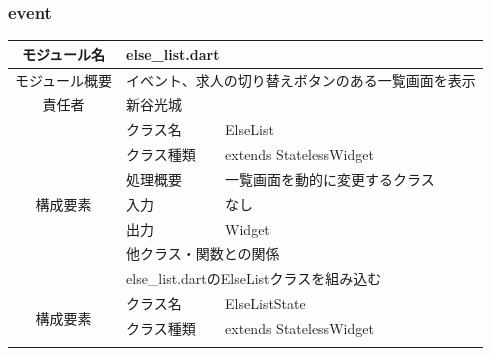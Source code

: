 \subsubsection{event}
\begin{table}[H]
  \centering
  \begin{tabular}{|c|l|l|} \hline
    モジュール名                & \multicolumn{2}{l|}{else\_list.dart}                                                                     \\ \hline
    モジュール概要               & \multicolumn{2}{p{12cm}|}{イベント、求人の切り替えボタンのある一覧画面を表示}                                                     \\ \hline
    責任者                   & \multicolumn{2}{l|}{新谷光城}                                                                                \\ \hline
    \multirow{7}{*}{構成要素} & クラス名                                                        & ElseList                                   \\ \cline{2-3}
                          & クラス種類                                                       & extends StatelessWidget                    \\ \cline{2-3}
                          & 処理概要                                                        & \multicolumn{1}{p{12cm}|}{一覧画面を動的に変更するクラス} \\ \cline{2-3}
                          & 入力                                                          & なし                                         \\ \cline{2-3}
                          & 出力                                                          & Widget                                     \\ \cline{2-3}
                          & \multicolumn{2}{l|}{他クラス・関数との関係}                                                                         \\ \cline{2-3}
                          & \multicolumn{2}{p{14cm}|}{else\_list.dartのElseListクラスを組み込む}                                              \\ \hline
    \multirow{7}{*}{構成要素} & クラス名                                                        & ElseListState                              \\ \cline{2-3}
                          & クラス種類                                                       & extends StatelessWidget                    \\ \cline{2-3}

\end{tabular}
\end{table}
